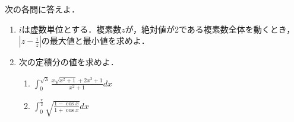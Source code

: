 \documentclass[../../main.tex]{subfiles}
\begin{document}
次の各問に答えよ．
\begin{enumerate}
  \item[問1]$i$は虚数単位とする．複素数$z$が，絶対値が2である複素数全体を動くとき，
    $\displaystyle \left| z-\frac{i}{z} \right|$の最大値と最小値を求めよ．
  \item[問2]次の定積分の値を求めよ．
    \begin{enumerate}
      \item$\displaystyle\int_0^{\sqrt3}\frac{x\sqrt{x^2+1}+2x^3+1}{x^2+1}dx$
      \item$\displaystyle\int_0^\frac{\pi}{2}\sqrt{\frac{1-\cos x}{1+\cos x}}dx$
    \end{enumerate}
\end{enumerate}
\end{document}
